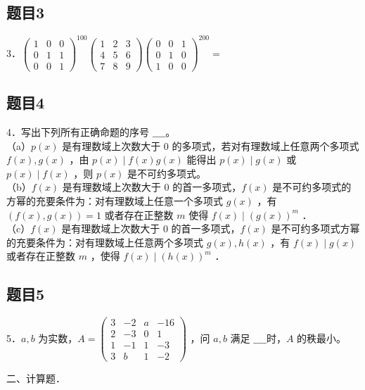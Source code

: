 \documentclass{article}
\begin{document}
\subsection{题目3}
3．\(\left(\begin{array}{lll}1 & 0 & 0 \\ 0 & 1 & 1 \\ 0 & 0 & 1\end{array}\right)^{100}\left(\begin{array}{lll}1 & 2 & 3 \\ 4 & 5 & 6 \\ 7 & 8 & 9\end{array}\right)\left(\begin{array}{lll}0 & 0 & 1 \\ 0 & 1 & 0 \\ 1 & 0 & 0\end{array}\right)^{200}=\)

\subsection{题目4}
4．写出下列所有正确命题的序号 \(\_\_\_\_\)。\\
（a）\(p(x)\) 是有理数域上次数大于 0 的多项式，若对有理数域上任意两个多项式 \(f(x), g(x)\) ，由 \(p(x) \mid f(x) g(x)\) 能得出 \(p(x) \mid g(x)\) 或 \(p(x) \mid f(x)\) ，则 \(p(x)\) 是不可约多项式。\\
（b）\(f(x)\) 是有理数域上次数大于 0 的首一多项式，\(f(x)\) 是不可约多项式的方幂的充要条件为：对有理数域上任意一个多项式 \(g(x)\) ，有 \((f(x), g(x))=1\) 或者存在正整数 \(m\) 使得 \(f(x) \mid(g(x))^{m}\) ．\\
（c）\(f(x)\) 是有理数域上次数大于 0 的首一多项式，\(f(x)\) 是不可约多项式方幂的充要条件为：对有理数域上任意两个多项式 \(g(x), h(x)\) ，有 \(f(x) \mid g(x)\) 或者存在正整数 \(m\) ，使得 \(f(x) \mid(h(x))^{m}\) ．

\subsection{题目5}
5．\(a, b\) 为实数，\(A=\left(\begin{array}{cccc}3 & -2 & a & -16 \\ 2 & -3 & 0 & 1 \\ 1 & -1 & 1 & -3 \\ 3 & b & 1 & -2\end{array}\right)\) ，问 \(a, b\) 满足 \(\_\_\_\_\)时，\(A\) 的秩最小。

二、计算题．\\
\end{document}
